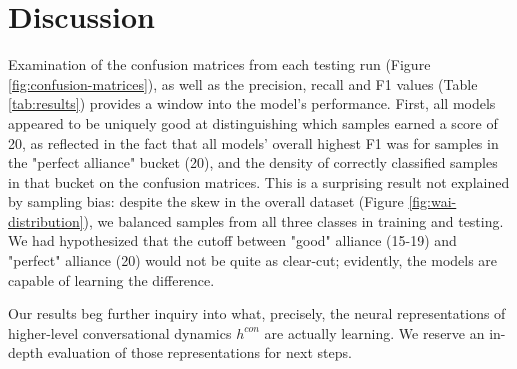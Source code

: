 \documentclass{article}
\begin{document}





\section{Discussion}
\label{sec:discussion}

Examination of the confusion matrices from each testing run (Figure \ref{fig:confusion-matrices}), as well as the precision, recall and F1 values (Table \ref{tab:results}) provides a window into the model's performance. First, all models appeared to be uniquely good at distinguishing which samples earned a score of 20, as reflected in the fact that all models' overall highest F1 was for samples in the "perfect alliance" bucket (20), and the density of correctly classified samples in that bucket on the confusion matrices. This is a surprising result not explained by sampling bias: despite the skew in the overall dataset (Figure \ref{fig:wai-distribution}), we balanced samples from all three classes in training and testing. We had hypothesized that the cutoff between "good" alliance (15-19) and "perfect" alliance (20) would not be quite as clear-cut; evidently, the models are capable of learning the difference.  

Our results beg further inquiry into what, precisely, the neural representations of higher-level conversational dynamics $h^{con}$ are actually learning. We reserve an in-depth evaluation of those representations for next steps.
\end{document}
